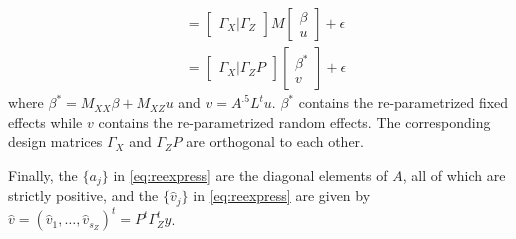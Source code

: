 \documentclass{report}
\begin{document}
\begin{enumerate}
\begin{equation*}
\begin{split}
        &= \begin{bmatrix} \Gamma_X | \Gamma_Z \end{bmatrix} M \begin{bmatrix} \beta \\ u \end{bmatrix} + \epsilon\\
        &= \begin{bmatrix} \Gamma_X | \Gamma_Z P \end{bmatrix} \begin{bmatrix} \beta^* \\ v \end{bmatrix} + \epsilon
      \end{split}
    \end{equation*}
    where $\beta^* = M_{XX}\beta + M_{XZ}u$ and $v = A^{.5}L^t u$.  $\beta^*$ contains the re-parametrized
    fixed effects while $v$ contains the re-parametrized random effects.  The corresponding design matrices
    $\Gamma_X$ and $\Gamma_Z P$ are orthogonal to each other.
\end{enumerate}
Finally, the $\{a_j\}$ in \eqref{eq:reexpress} are the diagonal elements of $A$, all of which are strictly positive, and the $\{\hat v_j\}$ in \eqref{eq:reexpress} are given by $\hat v = (\hat v_1, \dots, \hat v_{s_Z})^t = P^t \Gamma_Z^t y$.
\end{document}
